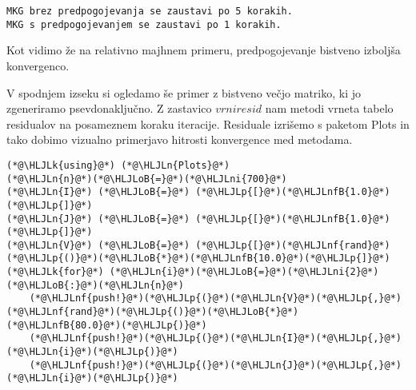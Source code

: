 \documentclass[12pt,a4paper]{article}
\newcommand{\HLJLk}[1]{\textcolor[RGB]{148,91,176}{\textbf{#1}}}
\newcommand{\HLJLn}[1]{#1}
\newcommand{\HLJLnf}[1]{\textcolor[RGB]{66,102,213}{#1}}
\newcommand{\HLJLnfB}[1]{\textcolor[RGB]{59,151,46}{#1}}
\newcommand{\HLJLni}[1]{\textcolor[RGB]{59,151,46}{#1}}
\newcommand{\HLJLoB}[1]{\textcolor[RGB]{102,102,102}{\textbf{#1}}}
\newcommand{\HLJLp}[1]{#1}
\begin{document}
\begin{lstlisting}
MKG brez predpogojevanja se zaustavi po 5 korakih.
MKG s predpogojevanjem se zaustavi po 1 korakih.
\end{lstlisting}


Kot vidimo že na relativno majhnem primeru, predpogojevanje bistveno izboljša konvergenco.


V spodnjem izseku si ogledamo še primer z bistveno večjo matriko, ki jo zgeneriramo psevdonaključno. Z zastavico $\textit{vrniresid}$ nam metodi vrneta tabelo residualov na posameznem koraku iteracije. Residuale izrišemo s paketom Plots in tako dobimo vizualno primerjavo hitrosti konvergence med metodama. 


\begin{lstlisting}
(*@\HLJLk{using}@*) (*@\HLJLn{Plots}@*)
(*@\HLJLn{n}@*)(*@\HLJLoB{=}@*)(*@\HLJLni{700}@*)
(*@\HLJLn{I}@*) (*@\HLJLoB{=}@*) (*@\HLJLp{[}@*)(*@\HLJLnfB{1.0}@*)(*@\HLJLp{]}@*)
(*@\HLJLn{J}@*) (*@\HLJLoB{=}@*) (*@\HLJLp{[}@*)(*@\HLJLnfB{1.0}@*)(*@\HLJLp{]}@*)
(*@\HLJLn{V}@*) (*@\HLJLoB{=}@*) (*@\HLJLp{[}@*)(*@\HLJLnf{rand}@*)(*@\HLJLp{()}@*)(*@\HLJLoB{*}@*)(*@\HLJLnfB{10.0}@*)(*@\HLJLp{]}@*)
(*@\HLJLk{for}@*) (*@\HLJLn{i}@*)(*@\HLJLoB{=}@*)(*@\HLJLni{2}@*)(*@\HLJLoB{:}@*)(*@\HLJLn{n}@*)
    (*@\HLJLnf{push!}@*)(*@\HLJLp{(}@*)(*@\HLJLn{V}@*)(*@\HLJLp{,}@*) (*@\HLJLnf{rand}@*)(*@\HLJLp{()}@*)(*@\HLJLoB{*}@*)(*@\HLJLnfB{80.0}@*)(*@\HLJLp{)}@*)
    (*@\HLJLnf{push!}@*)(*@\HLJLp{(}@*)(*@\HLJLn{I}@*)(*@\HLJLp{,}@*) (*@\HLJLn{i}@*)(*@\HLJLp{)}@*)
    (*@\HLJLnf{push!}@*)(*@\HLJLp{(}@*)(*@\HLJLn{J}@*)(*@\HLJLp{,}@*) (*@\HLJLn{i}@*)(*@\HLJLp{)}@*)


\end{lstlisting}
\end{document}
